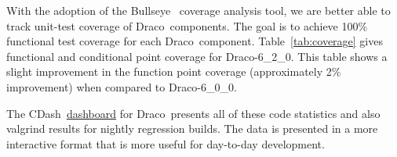 \documentclass[note]{ResearchNote_pdf}
\newcommand{\draco}{Draco}
\newcommand{\dracor}{\draco-6\_2\_0}
\newcommand{\cdash}{\textsf{CDash}}
\begin{document}


With the adoption of the \textsf{Bullseye}~\cite{bullseyeweb} coverage
analysis tool, we are better able to track unit-test coverage of
\draco\ components.  The goal is to achieve 100\% functional test
coverage for each \draco\ component.  Table~\ref{tab:coverage} gives
functional and conditional point coverage for \dracor.  This table
shows a slight improvement in the function point coverage
(approximately 2\% improvement) when compared to \draco-6\_0\_0.


The \cdash\ \hyperref[http://coder.lanl.gov/cdash]{dashboard} for
\draco\ presents all of these code statistics and also valgrind
results for nightly regression builds.  The data is presented in a
more interactive format that is more useful for day-to-day
development.
\end{document}

